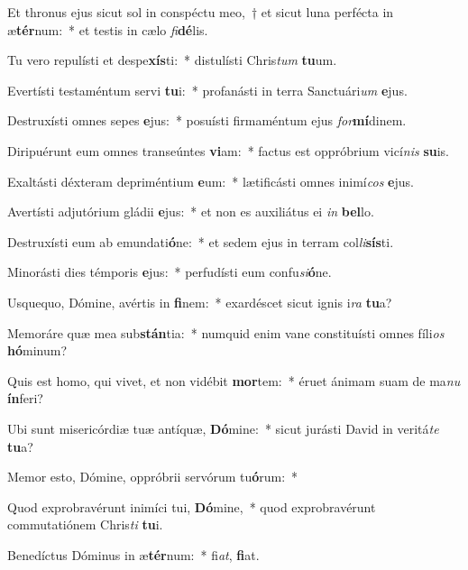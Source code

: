\item Et thronus ejus sicut sol in conspéctu meo,~† et sicut luna perfécta in æ\textbf{tér}num:~* et testis in cælo \textit{fi}\textbf{dé}lis.
\item Tu vero repulísti et despe\textbf{xís}ti:~* distulísti Chris\textit{tum} \textbf{tu}um.
\item Evertísti testaméntum servi \textbf{tu}i:~* profanásti in terra Sanctuári\textit{um} \textbf{e}jus.
\item Destruxísti omnes sepes \textbf{e}jus:~* posuísti firmaméntum ejus \textit{for}\textbf{mí}dinem.
\item Diripuérunt eum omnes transeúntes \textbf{vi}am:~* factus est oppróbrium vicí\textit{nis} \textbf{su}is.
\item Exaltásti déxteram depriméntium \textbf{e}um:~* lætificásti omnes inimí\textit{cos} \textbf{e}jus.
\item Avertísti adjutórium gládii \textbf{e}jus:~* et non es auxiliátus ei \textit{in} \textbf{bel}lo.
\item Destruxísti eum ab emundati\textbf{ó}ne:~* et sedem ejus in terram col\textit{li}\textbf{sís}ti.
\item Minorásti dies témporis \textbf{e}jus:~* perfudísti eum confu\textit{si}\textbf{ó}ne.
\item Usquequo, Dómine, avértis in \textbf{fi}nem:~* exardéscet sicut ignis i\textit{ra} \textbf{tu}a?
\item Memoráre quæ mea sub\textbf{stán}tia:~* numquid enim vane constituísti omnes fíli\textit{os} \textbf{hó}minum?
\item Quis est homo, qui vivet, et non vidébit \textbf{mor}tem:~* éruet ánimam suam de ma\textit{nu} \textbf{ín}feri?
\item Ubi sunt misericórdiæ tuæ antíquæ, \textbf{Dó}mine:~* sicut jurásti David in veritá\textit{te} \textbf{tu}a?
\item Memor esto, Dómine, oppróbrii servórum tu\textbf{ó}rum:~* 
\item Quod exprobravérunt inimíci tui, \textbf{Dó}mine,~* quod exprobravérunt commutatiónem Chris\textit{ti} \textbf{tu}i.
\item Benedíctus Dóminus in æ\textbf{tér}num:~* fi\textit{at}, \textbf{fi}at.
